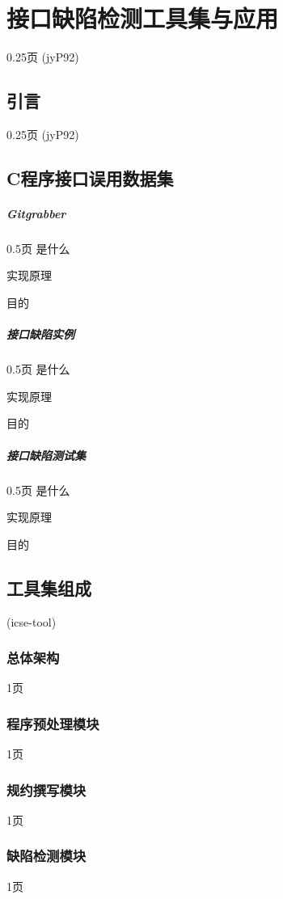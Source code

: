 \chapter{接口缺陷检测工具集与应用}
\label{cha:tools}
0.25页
(jyP92)

\section{引言}
0.25页
(jyP92)

\section{C程序接口误用数据集}

\paragraph{Gitgrabber}
0.5页
是什么

实现原理

目的

\paragraph{接口缺陷实例}
0.5页
是什么

实现原理

目的

\paragraph{接口缺陷测试集}
0.5页
是什么

实现原理

目的

\section{工具集组成}
(icse-tool)
\subsection{总体架构}
1页
\subsection{程序预处理模块}
1页
\subsection{规约撰写模块}
1页
\subsection{缺陷检测模块}
1页
